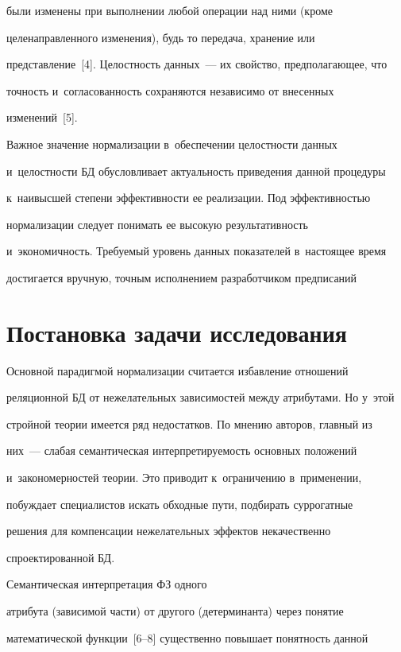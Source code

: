 были изменены при выполнении любой операции над ними (кроме 

целенаправленного изменения), будь то передача, хранение или 

представление~[4]. Целостность данных~--- их свойство, предполагающее, что 

точность и~согласованность сохраняются независимо от внесенных 

изменений~[5].



Важное значение нормализации в~обеспечении целостности данных 

и~целостности БД обусловливает актуальность приведения данной процедуры 

к~наивысшей степени эффективности ее реализации. Под эффективностью 

нормализации следует понимать ее высокую результативность 

и~экономичность. Требуемый уровень данных показателей в~настоящее время 

достигается вручную, точным исполнением разработчиком предписаний 



\section{Постановка задачи исследования}



  Основной парадигмой нормализации считается избавление отношений 

реляционной БД от нежелательных зависимостей между атрибутами. Но у~этой 

стройной теории имеется ряд недостатков. По мнению авторов, главный из 

них~--- слабая семантическая интерпретируемость основных положений 

и~закономерностей теории. Это приводит к~ограничению в~применении, 

побуждает специалистов искать обходные пути, подбирать суррогатные 

решения для компенсации нежелательных эффектов некачественно 

спроектированной БД.

  

  Семантическая интерпретация ФЗ одного 

атрибута (зависимой части) от другого (детерминанта) через понятие 

математической функции~[6--8] существенно повышает понятность данной 

